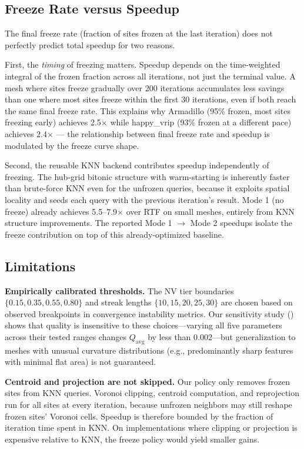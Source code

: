\subsection{Freeze Rate versus Speedup}

The final freeze rate (fraction of sites frozen at the last iteration) does not perfectly predict total speedup for two reasons.

First, the \emph{timing} of freezing matters. Speedup depends on the time-weighted integral of the frozen fraction across all iterations, not just the terminal value. A mesh where sites freeze gradually over 200 iterations accumulates less savings than one where most sites freeze within the first 30 iterations, even if both reach the same final freeze rate. This explains why Armadillo (95\% frozen, most sites freezing early) achieves 2.5$\times$ while happy\_vrip (93\% frozen at a different pace) achieves 2.4$\times$ --- the relationship between final freeze rate and speedup is modulated by the freeze curve shape.

Second, the reusable KNN backend contributes speedup independently of freezing. The hub-grid bitonic structure with warm-starting is inherently faster than brute-force KNN even for the unfrozen queries, because it exploits spatial locality and seeds each query with the previous iteration's result. Mode 1 (no freeze) already achieves 5.5--7.9$\times$ over RTF \cite{yao2023rtf} on small meshes, entirely from KNN structure improvements. The reported Mode 1 $\to$ Mode 2 speedups isolate the freeze contribution on top of this already-optimized baseline.

\subsection{Limitations}

\textbf{Empirically calibrated thresholds.} The NV tier boundaries $\{0.15, 0.35, 0.55, 0.80\}$ and streak lengths $\{10, 15, 20, 25, 30\}$ are chosen based on observed breakpoints in convergence instability metrics. Our sensitivity study () shows that quality is insensitive to these choices---varying all five parameters across their tested ranges changes $Q_{\mathrm{avg}}$ by less than 0.002---but generalization to meshes with unusual curvature distributions (e.g., predominantly sharp features with minimal flat area) is not guaranteed.

\textbf{Centroid and projection are not skipped.} Our policy only removes frozen sites from KNN queries. Voronoi clipping, centroid computation, and reprojection run for all sites at every iteration, because unfrozen neighbors may still reshape frozen sites' Voronoi cells. Speedup is therefore bounded by the fraction of iteration time spent in KNN. On implementations where clipping or projection is expensive relative to KNN, the freeze policy would yield smaller gains.

